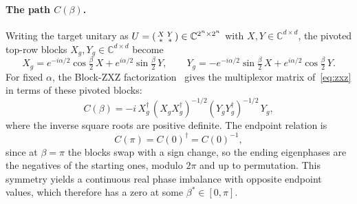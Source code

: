 \documentclass[11pt]{article}
\begin{document}
\paragraph{The path $C(\beta)$.} Writing the target unitary as $U=\begin{psmallmatrix}X&Y\\ \ast&\ast\end{psmallmatrix}\in\mathbb C^{2^n\times 2^n}$ with $X,Y\in\mathbb C^{d\times d}$, the pivoted top-row blocks $X_g,Y_g\in\mathbb C^{d\times d}$ become
\begin{equation}\label{eq:path}
X_g=e^{-i\alpha/2}\cos\tfrac\beta2\,X+e^{i\alpha/2}\sin\tfrac\beta2\,Y,\qquad
Y_g=-e^{-i\alpha/2}\sin\tfrac\beta2\,X+e^{i\alpha/2}\cos\tfrac\beta2\,Y .
\end{equation}
For fixed $\alpha$, the Block-ZXZ factorization~\cite[Sec.~4.1]{zxz} gives the
multiplexor matrix of~\eqref{eq:zxz} in terms of these pivoted blocks:
\begin{equation}\label{eq:Cdef}
C(\beta)=-i\,X_g^\dagger\,(X_gX_g^\dagger)^{-1/2}(Y_gY_g^\dagger)^{-1/2}\,Y_g,
\end{equation}
where the inverse square roots are positive definite. 
The endpoint relation is
\begin{equation}\label{eq:inv}
C(\pi)=C(0)^\dagger=C(0)^{-1},
\end{equation}
since at $\beta=\pi$ the blocks swap with a sign change, so the ending eigenphases are the negatives of the starting ones, modulo $2\pi$ and up to permutation. 
This symmetry yields a continuous real phase imbalance with opposite endpoint values, which therefore has a zero at some $\beta^\ast\in[0,\pi]$.
\end{document}
